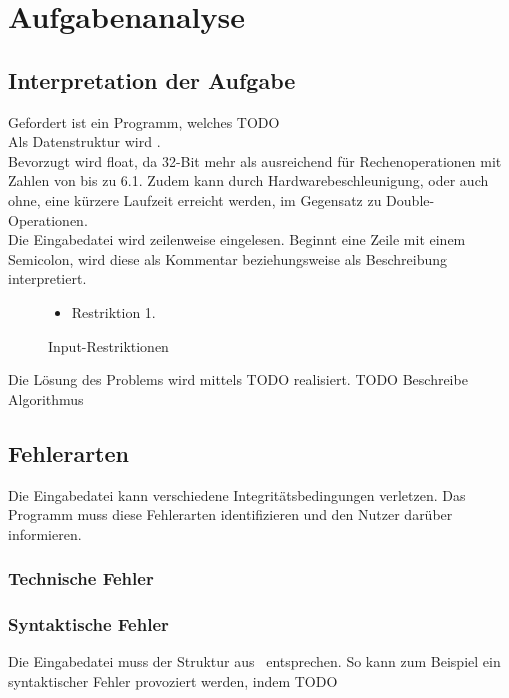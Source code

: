 \chapter{Aufgabenanalyse}\label{ch:aufgabenanalyse}


\section{Interpretation der Aufgabe}\label{sec:interpretation-der-aufgabe}
Gefordert ist ein Programm, welches TODO\\ %

Als Datenstruktur wird .\\%
Bevorzugt wird float, da 32-Bit mehr als ausreichend für Rechenoperationen mit Zahlen von bis zu 6.1.
Zudem kann durch Hardwarebeschleunigung, oder auch ohne, eine kürzere Laufzeit erreicht werden, im Gegensatz zu Double-Operationen.\\ %

Die Eingabedatei wird zeilenweise eingelesen.
Beginnt eine Zeile mit einem Semicolon, wird diese als Kommentar beziehungsweise als Beschreibung interpretiert.
\begin{figure}[h]
    \centering
    \caption{Input-Restriktionen}
    \begin{itemize}[noitemsep]
        \item Restriktion 1.
    \end{itemize}
    \label{fig:input-restrictions}
\end{figure}

Die Lösung des Problems wird mittels TODO realisiert. %
TODO Beschreibe Algorithmus %


\section{Fehlerarten}\label{sec:fehlerarten}
Die Eingabedatei kann verschiedene Integritätsbedingungen verletzen.
Das Programm muss diese Fehlerarten identifizieren und den Nutzer darüber informieren.

\subsection{Technische Fehler}\label{subsec:technische-fehler}

\subsection{Syntaktische Fehler}\label{subsec:syntaktische-fehler}
Die Eingabedatei muss der Struktur aus~ entsprechen.
So kann zum Beispiel ein syntaktischer Fehler provoziert werden, indem TODO%

